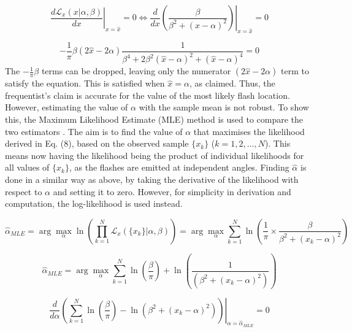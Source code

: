 \documentclass[12pt]{report} %
\begin{document}
\begin{equation}
    \left. \frac{d\mathcal{L}_{x}(x|\alpha, \beta)}{dx} \right|_{x = \hat{x}} = 0 \iff \left. \frac{d}{dx} \left(\frac{\beta}{\beta^{2} + (x - \alpha)^{2}}\right) \right|_{x = \hat{x}} = 0
\end{equation}

\begin{equation}
    -\frac{1}{\pi} \beta (2\hat{x} - 2\alpha)\frac{1}{\beta^{4} + 2\beta^{2}(\hat{x} - \alpha)^{2} + (\hat{x} - \alpha)^{4}} = 0
\end{equation}
\newline
The $-\frac{1}{\pi} \beta$ terms can be dropped, leaving only the numerator $(2\hat{x} - 2\alpha)$ term to satisfy the equation. This is satisfied when $\hat{x} = \alpha$, as claimed. Thus, the frequentist's claim is accurate for the value of the most likely flash location. However, estimating the value of $\alpha$ with the sample mean is not robust. To show this, the Maximum Likelihood Estimate (MLE) method is used to compare the two estimators \cite[pp 135-137]{FJames2006}. The aim is to find the value of $\alpha$ that maximises the likelihood derived in Eq. (8), based on the observed sample $\{x_k\}$ ($k = 1, 2,\dots, N$). This means now having the likelihood being the product of individual likelihoods for all values of $\{x_k\}$, as the flashes are emitted at independent angles. Finding $\hat{\alpha}$ is done in a similar way as above, by taking the derivative of the likelihood with respect to $\alpha$ and setting it to zero. However, for simplicity in derivation and computation, the log-likelihood is used instead.

\begin{equation}
    \hat{\alpha}_{MLE} = \arg \max_{\alpha} \ln(\prod_{k=1}^{N}  \mathcal{L}_{x}(\{x_{k}\}|\alpha, \beta)) = \arg \max_{\alpha} \sum_{k=1}^{N} \ln(\frac{1}{\pi} \times \frac{\beta}{\beta^{2} + (x_{k} - \alpha)^{2}})
\end{equation}

\begin{equation}
    \hat{\alpha}_{MLE} = \arg \max_{\alpha} \sum_{k=1}^{N} \ln(\frac{\beta}{\pi}) + \ln(\frac{1}{(\beta^{2} + (x_{k} - \alpha)^{2})})
\end{equation}

\begin{equation}
    \left. \frac{d}{d\alpha} \left( \sum_{k=1}^{N} \ln(\frac{\beta}{\pi}) - \ln(\beta^{2} + (x_{k} - \alpha)^{2}) \right) \right|_{\alpha = \hat{\alpha}_{MLE}} = 0
\end{equation}
\end{document}
